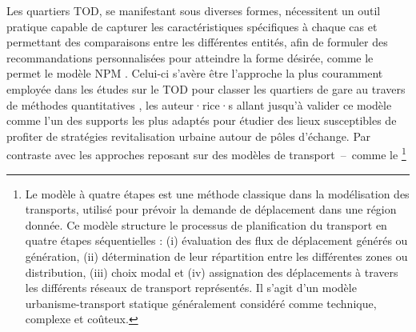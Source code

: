 \begin{refsegment}
Les quartiers \acrshort{TOD}, se manifestant sous diverses formes, nécessitent un outil pratique capable de capturer les caractéristiques spécifiques à chaque cas et permettant des comparaisons entre les différentes entités, afin de formuler des recommandations personnalisées pour atteindre la forme désirée, comme le permet le modèle \acrshort{NPM} \textcolor{blue}{\autocite[270]{li_transit_2019}}. Celui-ci s'avère être l'approche la plus couramment employée dans les études sur le \acrshort{TOD} pour classer les quartiers de gare au travers de méthodes quantitatives \textcolor{blue}{\autocites[3]{arliani_measuring_2023}[2]{caset_planning_2019}[1]{caset_integrating_2020}[2]{dou_integrating_2021}[113]{ibraeva_transit-oriented_2020}[270]{li_transit_2019}}, les auteur·rice·s \textcolor{blue}{\textcite[578]{banerjee_mobility_2022}} allant jusqu'à valider ce modèle comme l'un des supports les plus adaptés pour étudier des lieux susceptibles de profiter de stratégies revitalisation urbaine autour de pôles d'échange. Par contraste avec les approches reposant sur des modèles de transport~–~comme le \footnote{
    Le modèle à quatre étapes est une méthode classique dans la modélisation des transports, utilisé pour prévoir la demande de \gls{déplacement} dans une région donnée. Ce modèle structure le processus de planification du transport en quatre étapes séquentielles : (i) évaluation des flux de déplacement générés ou génération, (ii) détermination de leur répartition entre les différentes zones ou distribution, (iii) choix modal et (iv) assignation des déplacements à travers les différents réseaux de transport représentés. Il s'agit d'un modèle urbanisme-transport statique généralement considéré comme technique, complexe et coûteux.
}
\end{refsegment}
